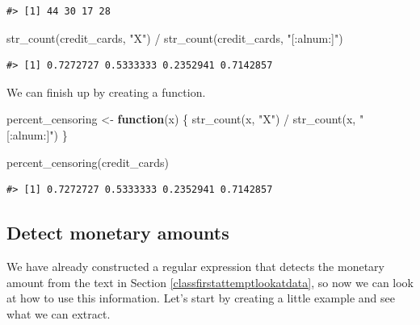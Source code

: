 \documentclass[
]{krantz}
\makeatletter
\newenvironment{Shaded}{\begin{snugshade}}{\end{snugshade}}
\newcommand{\ControlFlowTok}[1]{\textcolor[rgb]{0.13,0.29,0.53}{\textbf{#1}}}
\newcommand{\FunctionTok}[1]{\textcolor[rgb]{0.00,0.00,0.00}{#1}}
\newcommand{\NormalTok}[1]{#1}
\newcommand{\OtherTok}[1]{\textcolor[rgb]{0.56,0.35,0.01}{#1}}
\newcommand{\SpecialCharTok}[1]{\textcolor[rgb]{0.00,0.00,0.00}{#1}}
\newcommand{\StringTok}[1]{\textcolor[rgb]{0.31,0.60,0.02}{#1}}
\newenvironment{kframe}{%
\medskip{}
\setlength{\fboxsep}{.8em}
 \def\at@end@of@kframe{}%
 \ifinner\ifhmode%
  \def\at@end@of@kframe{\end{minipage}}%
  \begin{minipage}{\columnwidth}%
 \fi\fi%
 \def\FrameCommand##1{\hskip\@totalleftmargin \hskip-\fboxsep
 \colorbox{shadecolor}{##1}\hskip-\fboxsep
     \hskip-\linewidth \hskip-\@totalleftmargin \hskip\columnwidth}%
 \MakeFramed {\advance\hsize-\width
   \@totalleftmargin\z@ \linewidth\hsize
   \@setminipage}}%
 {\par\unskip\endMakeFramed%
 \at@end@of@kframe}
\renewenvironment{Shaded}{\begin{kframe}}{\end{kframe}}
\makeatother
\begin{document}
\begin{verbatim}
#> [1] 44 30 17 28
\end{verbatim}

\begin{Shaded}
\begin{Highlighting}[]
\FunctionTok{str\_count}\NormalTok{(credit\_cards, }\StringTok{"X"}\NormalTok{) }\SpecialCharTok{/} \FunctionTok{str\_count}\NormalTok{(credit\_cards, }\StringTok{"[:alnum:]"}\NormalTok{)}
\end{Highlighting}
\end{Shaded}

\begin{verbatim}
#> [1] 0.7272727 0.5333333 0.2352941 0.7142857
\end{verbatim}

We can finish up by creating a function.

\begin{Shaded}
\begin{Highlighting}[]
\NormalTok{percent\_censoring }\OtherTok{\textless{}{-}} \ControlFlowTok{function}\NormalTok{(x) \{}
  \FunctionTok{str\_count}\NormalTok{(x, }\StringTok{"X"}\NormalTok{) }\SpecialCharTok{/} \FunctionTok{str\_count}\NormalTok{(x, }\StringTok{"[:alnum:]"}\NormalTok{)}
\NormalTok{\}}

\FunctionTok{percent\_censoring}\NormalTok{(credit\_cards)}
\end{Highlighting}
\end{Shaded}

\begin{verbatim}
#> [1] 0.7272727 0.5333333 0.2352941 0.7142857
\end{verbatim}

\hypertarget{detect-monetary-amounts}{%
\subsection{Detect monetary amounts}\label{detect-monetary-amounts}}

We have already constructed a regular expression that detects the monetary amount from the text in Section \ref{classfirstattemptlookatdata}, so now we can look at how to use this information.
Let's start by creating a little example and see what we can extract.

\begin{Shaded}
\end{Shaded}
\end{document}
